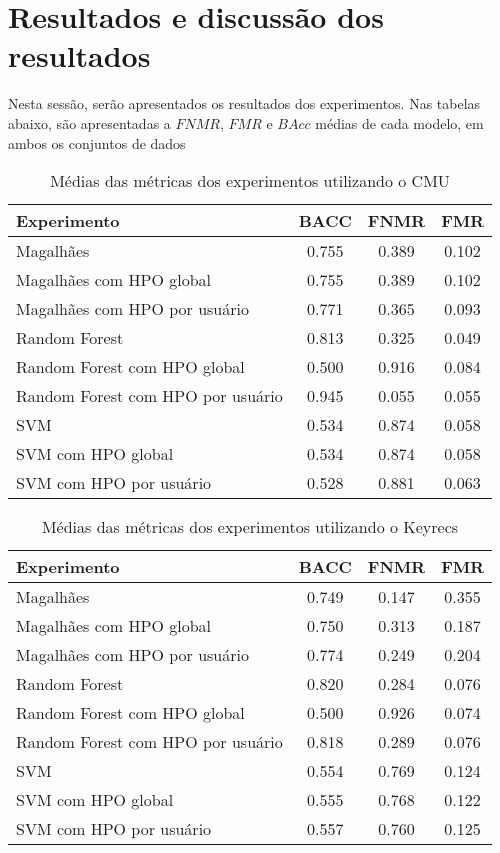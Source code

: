 \section{Resultados e discussão dos resultados}\label{sec:resultados}

Nesta sessão, serão apresentados os resultados dos experimentos. Nas tabelas abaixo, são apresentadas a $FNMR$, $FMR$ e $BAcc$ médias de cada modelo, em ambos os conjuntos de dados

\begin{table}[htbp]
\centering
\caption{Médias das métricas dos experimentos utilizando o CMU}
\label{tab:exp_metric_averages_cmu}
\begin{tabular}{|l|c|c|c|}
\hline
\textbf{Experimento} & \textbf{BACC} & \textbf{FNMR} & \textbf{FMR} \\
\hline
Magalhães & 0.755 & 0.389 & 0.102 \\
\hline
Magalhães com HPO global & 0.755 & 0.389 & 0.102 \\
\hline
Magalhães com HPO por usuário & 0.771 & 0.365 & 0.093 \\
\hline
Random Forest & 0.813 & 0.325 & 0.049 \\
\hline
Random Forest com HPO global & 0.500 & 0.916 & 0.084 \\
\hline
Random Forest com HPO por usuário & 0.945 & 0.055 & 0.055 \\
\hline
SVM & 0.534 & 0.874 & 0.058 \\
\hline
SVM com HPO global & 0.534 & 0.874 & 0.058 \\
\hline
SVM com HPO por usuário & 0.528 & 0.881 & 0.063 \\
\hline
\end{tabular}
\end{table}

\begin{table}[htbp]
\centering
\caption{Médias das métricas dos experimentos utilizando o Keyrecs}
\label{tab:exp_metric_averages_keyrecs}
\begin{tabular}{|l|c|c|c|}
\hline
\textbf{Experimento} & \textbf{BACC} & \textbf{FNMR} & \textbf{FMR} \\
\hline
Magalhães & 0.749 & 0.147 & 0.355 \\
\hline
Magalhães com HPO global & 0.750 & 0.313 & 0.187 \\
\hline
Magalhães com HPO por usuário & 0.774 & 0.249 & 0.204 \\
\hline
Random Forest & 0.820 & 0.284 & 0.076 \\
\hline
Random Forest com HPO global & 0.500 & 0.926 & 0.074 \\
\hline
Random Forest com HPO por usuário & 0.818 & 0.289 & 0.076 \\
\hline
SVM & 0.554 & 0.769 & 0.124 \\
\hline
SVM com HPO global & 0.555 & 0.768 & 0.122 \\
\hline
SVM com HPO por usuário & 0.557 & 0.760 & 0.125 \\
\hline
\end{tabular}
\end{table}

